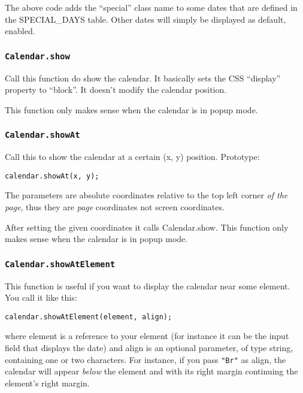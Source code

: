 \documentclass[a4paper,twoside,10pt]{dynadoc}
\begin{document}
The above code adds the ``special'' class name to some dates that are defined
in the SPECIAL\_DAYS table.  Other dates will simply be displayed as default,
enabled.

\subsubsection{\texttt{Calendar.show}}\label{sec:Calendar.show}

Call this function do show the calendar.  It basically sets the CSS ``display''
property to ``block''.  It doesn't modify the calendar position.

This function only makes sense when the calendar is in popup mode.

\subsubsection{\texttt{Calendar.showAt}}\label{sec:Calendar.showAt}

Call this to show the calendar at a certain (x, y) position.  Prototype:

\begin{verbatim}
calendar.showAt(x, y);
\end{verbatim}

\noindent The parameters are absolute coordinates relative to the top left
corner \emph{of the page}, thus they are \emph{page} coordinates not screen
coordinates.

After setting the given coordinates it calls Calendar.show.  This function only
makes sense when the calendar is in popup mode.

\subsubsection{\texttt{Calendar.showAtElement}}\label{sec:Calendar.showAtElement}

This function is useful if you want to display the calendar near some element.
You call it like this:

\begin{verbatim}
calendar.showAtElement(element, align);
\end{verbatim}

\noindent where element is a reference to your element (for instance it can be the input
field that displays the date) and align is an optional parameter, of type string,
containing one or two characters.  For instance, if you pass \texttt{"Br"} as
align, the calendar will appear \emph{below} the element and with its right
margin continuing the element's right margin.
\end{document}
